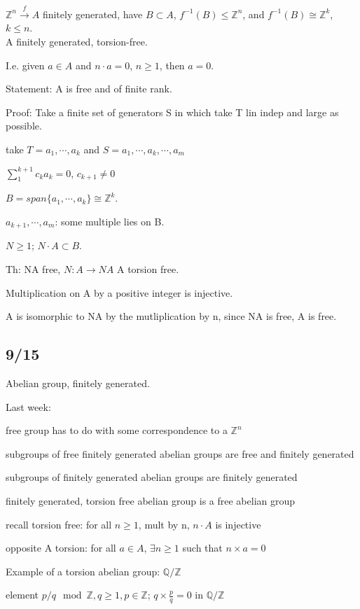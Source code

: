 \documentclass[12pt]{article}
\begin{document}
$\mathds{Z}^n \xrightarrow{f} A$ finitely generated, have $B \subset A$, $f^{-1}(B) \leq \mathds{Z}^n$, and $f^{-1}(B) \cong \mathds{Z}^k$, $k \leq n$.\\

\noindent
A finitely generated, torsion-free.

I.e. given $a \in A$ and $n \cdot a = 0$, $n \geq 1$, then $a = 0$.

Statement: A is free and of finite rank.

\noindent
Proof: Take a finite set of generators S in which take T lin indep and large as possible.

take $T = a_1, \cdots, a_k$ and $S = a_1, \cdots, a_k, \cdots, a_m$

$\sum_{1}^{k + 1} c_ka_k = 0$, $c_{k+1} \neq 0$

$B = span\{a_1, \cdots, a_k\} \cong \mathds{Z}^k$.

$a_{k + 1}, \cdots,a_m$: some multiple lies on B.

$N \geq 1$; $N \cdot A \subset B$.

Th: NA free, $N: A \to NA$ A torsion free.

Multiplication on A by a positive integer is injective.

A is isomorphic to NA by the mutliplication by n, since NA is free, A is free.

\subsection{9/15}

\noindent
Abelian group, finitely generated.

\noindent
Last week:

free group has to do with some correspondence to a $\mathds{Z}^n$

subgroups of free finitely generated abelian groups are free and finitely generated

subgroups of finitely generated abelian groups are finitely generated

finitely generated, torsion free abelian group is a free abelian group

recall torsion free: for all $n \geq 1$, mult by n, $n \cdot A$ is injective

opposite A torsion: for all $a \in A$, $\exists n \geq 1$ such that $n \times a = 0$

\noindent
Example of a torsion abelian group: $\mathds{Q}/\mathds{Z}$

element $p/q \mod{\mathds{Z}}, q \geq 1, p \in \mathds{Z}$; $q \times \frac{p}{q} = 0$ in $\mathds{Q}/\mathds{Z}$
\end{document}
